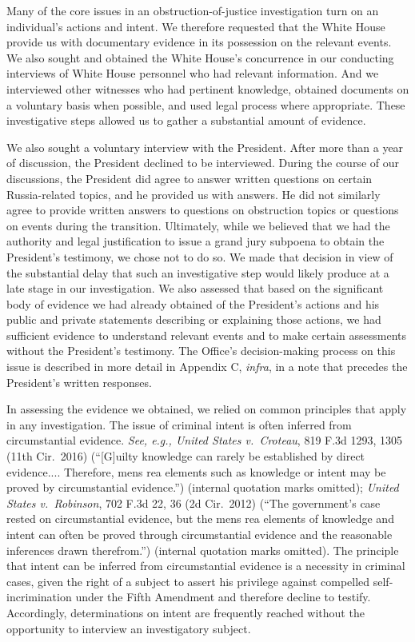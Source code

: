 Many of the core issues in an obstruction-of-justice investigation turn on an individual’s actions and intent.
We therefore requested that the White House provide us with documentary evidence in its possession on the relevant events.
We also sought and obtained the White House’s concurrence in our conducting interviews of White House personnel who had relevant information.
And we interviewed other witnesses who had pertinent knowledge, obtained documents on a voluntary basis when possible, and used legal process where appropriate.
These investigative steps allowed us to gather a substantial amount of evidence.

We also sought a voluntary interview with the President.
After more than a year of discussion, the President declined to be interviewed.
During the course of our discussions, the President did agree to answer written questions on certain Russia-related topics, and he provided us with answers.
He did not similarly agree to provide written answers to questions on obstruction topics or questions on events during the transition.
Ultimately, while we believed that we had the authority and legal justification to issue a grand jury subpoena to obtain the President’s testimony, we chose not to do so.
We made that decision in view of the substantial delay that such an investigative step would likely produce at a late stage in our investigation.
We also assessed that based on the significant body of evidence we had already obtained of the President’s actions and his public and private statements describing or explaining those actions, we had sufficient evidence to understand relevant events and to make certain assessments without the President’s testimony.
The Office’s decision-making process on this issue is described in more detail in Appendix C, \textit{infra}, in a note that precedes the President’s written responses.

In assessing the evidence we obtained, we relied on common principles that apply in any investigation.
The issue of criminal intent is often inferred from circumstantial evidence.
\textit{See, e.g., United States v.\ Croteau}, 819 F.3d 1293, 1305 (11th Cir.~2016) (“[G]uilty knowledge can rarely be established by direct evidence....
Therefore, mens rea elements such as knowledge or intent may be proved by circumstantial evidence.”) (internal quotation marks omitted);
\textit{United States v.\ Robinson}, 702 F.3d 22, 36 (2d Cir.~2012) (“The government’s case rested on circumstantial evidence, but the mens rea elements of knowledge and intent can often be proved through circumstantial evidence and the reasonable inferences drawn therefrom.”) (internal quotation marks omitted).
The principle that intent can be inferred from circumstantial evidence is a necessity in criminal cases, given the right of a subject to assert his privilege against compelled self-incrimination under the Fifth Amendment and therefore decline to testify.
Accordingly, determinations on intent are frequently reached without the opportunity to interview an investigatory subject.

